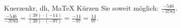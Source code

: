 \begin{MAufgabe}{Kuerzen}{kr, dh, MaTeX}
K\"urzen Sie soweit m\"oglich: $\frac{-546}{-3783}$.\\ 
\ifLsg\MLoesung
\quad $\frac{-546}{-3783}=\frac{(39)\cdot(-14)}{(39)\cdot(-97)}=\frac{-14}{-97}=\frac{14}{97}$.\else\relax\fi
 \end{MAufgabe}